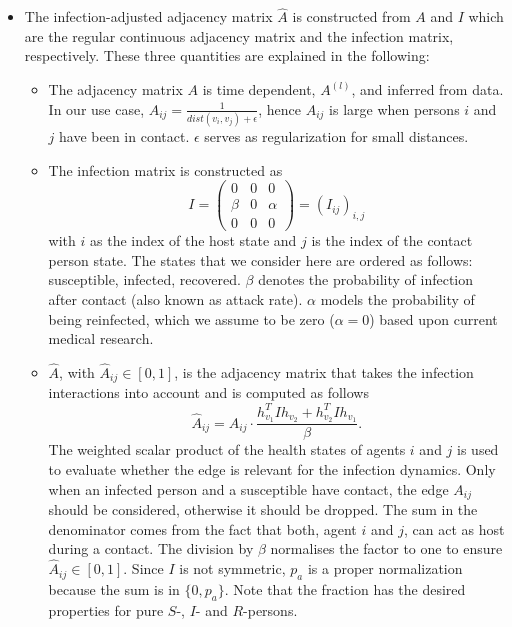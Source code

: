 \begin{itemize}
\begin{itemize}
		\item The infection-adjusted adjacency matrix $\hat{A}$ is constructed from $A$ and $I$ which are the regular continuous adjacency matrix and the infection matrix, respectively. These three quantities are explained in the following:
		\begin{itemize}
			\item The adjacency matrix $A$ is time dependent, $A^{(l)}$, and inferred from data. In our use case, $A_{ij} = \frac{1}{dist(v_i, v_j)+\epsilon}$, hence $A_{ij}$ is large when persons $i$ and $j$ have been in contact. $\epsilon$ serves as regularization for small distances.
			\item The infection matrix is constructed as
			\begin{equation}
				I =
				\begin{pmatrix}
					0     &  0  & 0 \\
					\beta &  0  & \alpha \\
					0     &  0  & 0
				\end{pmatrix}
				=
				(I_{ij})_{i,j}
			\end{equation}
			with $i$ as the index of the host state and $j$ is the index of the contact person state. The states that we consider here are ordered as follows: susceptible, infected, recovered. $\beta$ denotes the probability of infection  after contact (also known as attack rate). $\alpha$ models the probability of being reinfected, which we assume to be zero ($\alpha=0$) based upon current medical research.
			\item $\hat{A}$, with $\hat{A}_{ij}\in [0, 1]$, is the adjacency matrix that takes the infection interactions into account and is computed as follows
			\begin{equation}
				\hat{A}_{ij} = A_{ij}\cdot \frac{ h_{v_1}^T I h_{v_2} + h_{v_2}^T I h_{v_1} }{\beta}.
			\end{equation}
			The weighted scalar product of the health states of agents $i$ and $j$ is used to evaluate whether the edge is relevant for the infection dynamics. Only when an infected person and a susceptible have contact, the edge $A_{ij}$ should be considered, otherwise it should be dropped.	The sum in the denominator comes from the fact that both, agent $i$ and $j$, can act as host during a contact. The division by $\beta$ normalises the factor to one to ensure $\hat{A}_{ij} \in [0, 1]$. Since $I$ is not symmetric, $p_a$ is a proper normalization because the sum is in $\{0, p_a\}$. Note that the fraction has the desired properties for pure $S$-, $I$- and $R$-persons.

\end{itemize}
\end{itemize}
\end{itemize}
